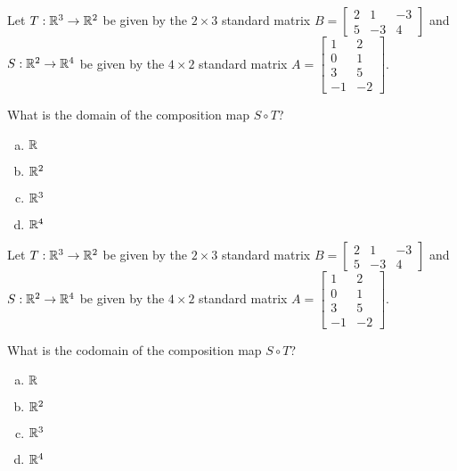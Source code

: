\begin{activity}{5}
Let \(T: \mathbb{R}^3 \rightarrow \mathbb{R}^2\) be given by the \(2\times 3\) standard matrix \(B=\begin{bmatrix} 2 & 1 & -3 \\ 5 & -3 & 4 \end{bmatrix}\) and \(S: \mathbb{R}^2 \rightarrow \mathbb{R}^4\) be given by the \(4\times 2\) standard matrix \(A=\begin{bmatrix} 1 & 2 \\ 0 & 1 \\ 3 & 5 \\ -1 & -2 \end{bmatrix}\).

What is the domain of the composition map \(S \circ T\)?
\begin{enumerate}[(a)]
\item \(\mathbb{R}\)
\item \(\mathbb{R}^2\)
\item \(\mathbb{R}^3\)
\item \(\mathbb{R}^4\)
\end{enumerate}
\end{activity}

\begin{activity}{3}
Let \(T: \mathbb{R}^3 \rightarrow \mathbb{R}^2\) be given by the \(2\times 3\) standard matrix \(B=\begin{bmatrix} 2 & 1 & -3 \\ 5 & -3 & 4 \end{bmatrix}\) and \(S: \mathbb{R}^2 \rightarrow \mathbb{R}^4\) be given by the \(4\times 2\) standard matrix \(A=\begin{bmatrix} 1 & 2 \\ 0 & 1 \\ 3 & 5 \\ -1 & -2 \end{bmatrix}\).

What is the codomain of the composition map \(S \circ T\)?
\begin{enumerate}[(a)]
\item \(\mathbb{R}\)
\item \(\mathbb{R}^2\)
\item \(\mathbb{R}^3\)
\item \(\mathbb{R}^4\)
\end{enumerate}
\end{activity}

